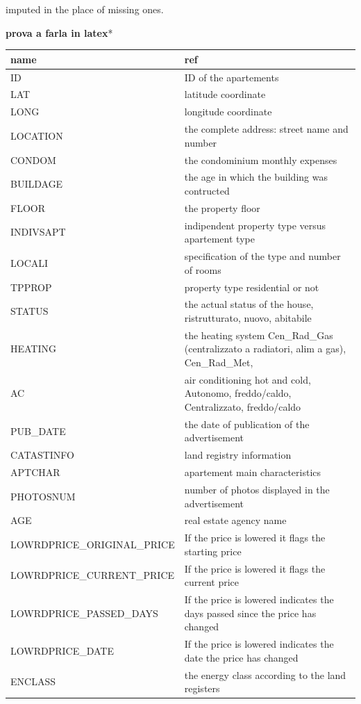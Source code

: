 \documentclass[
  12pt,
  a4paper,
  oneside]{book}
\theoremstyle{definition}
\theoremstyle{definition}
\theoremstyle{definition}
\theoremstyle{remark}
\begin{document}
imputed in the place of missing ones.

\textbf{prova a farla in latex}*

\begin{longtable}{ll}
\toprule
name & ref\\
\midrule
ID & ID of the apartements\\
LAT & latitude coordinate\\
LONG & longitude coordinate\\
LOCATION & the complete address: street name and number\\
CONDOM & the condominium monthly expenses\\
\addlinespace
BUILDAGE & the age in which the building was contructed\\
FLOOR & the property floor\\
INDIVSAPT & indipendent property type versus apartement type\\
LOCALI & specification of the type and number of rooms\\
TPPROP & property type residential or not\\
\addlinespace
STATUS & the actual status of the house, ristrutturato, nuovo, abitabile\\
HEATING & the heating system Cen\_Rad\_Gas (centralizzato a radiatori, alim a gas), Cen\_Rad\_Met,\\
AC & air conditioning hot and cold, Autonomo, freddo/caldo, Centralizzato, freddo/caldo\\
PUB\_DATE & the date of publication of the advertisement\\
CATASTINFO & land registry information\\
\addlinespace
APTCHAR & apartement main characteristics\\
PHOTOSNUM & number of photos displayed in the advertisement\\
AGE & real estate agency name\\
LOWRDPRICE\_ORIGINAL\_PRICE & If the price is lowered it flags the starting price\\
LOWRDPRICE\_CURRENT\_PRICE & If the price is lowered it flags the current price\\
\addlinespace
LOWRDPRICE\_PASSED\_DAYS & If the price is lowered indicates the days passed since the price has changed\\
LOWRDPRICE\_DATE & If the price is lowered indicates the date the price has changed\\
ENCLASS & the energy class according to the land registers\\

\end{longtable}
\end{document}
